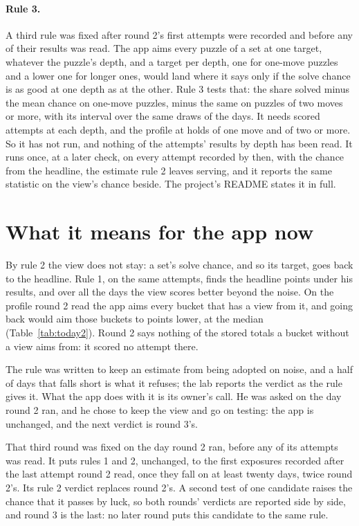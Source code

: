 \documentclass[11pt]{article}
\begin{document}
\paragraph{Rule 3.} A third rule was fixed after round 2's first attempts were recorded and before
any of their results was read. The app aims every puzzle of a set at one target, whatever the
puzzle's depth, and a target per depth, one for one-move puzzles and a lower one for longer
ones, would land where it says only if the solve chance is as good at one depth as at the other.
Rule 3 tests that: the share solved minus the mean chance on one-move puzzles, minus the same on
puzzles of two moves or more, with its interval over the same draws of the days. It needs
\TwoNeeded{} scored attempts at each depth, and the profile at \TwoRuleThreeCommit{} holds
\TwoOneScored{} of one move and \TwoTwoScored{} of two or more. So it has not run, and nothing of
the attempts' results by depth has been read. It runs once, at a later check, on every attempt
recorded by then, with the chance from the headline, the estimate rule 2 leaves serving, and it
reports the same statistic on the view's chance beside. The project's README states it in full.

\section{What it means for the app now}

By rule 2 the view does not stay: a set's solve chance, and so its target, goes back to the
headline. Rule 1, on the same attempts, finds the headline \TwoGap{} points under his results, and
over all the days the view scores better beyond the noise. On the profile round 2 read the app
aims every bucket that has a view from it, and going back would aim those \TwoWithView{} buckets
\TwoDropMin{} to \TwoDropMax{} points lower, \TwoDropMedian{} at the median
(Table~\ref{tab:today2}). Round 2 says nothing of the stored totals a bucket without a view aims
from: it scored no attempt there.

The rule was written to keep an estimate from being adopted on noise, and a half of \TwoHTwoDays{}
days that falls short is what it refuses; the lab reports the verdict as the rule gives it. What
the app does with it is its owner's call. He was asked on the day round 2 ran, and he chose to
keep the view and go on testing: the app is unchanged, and the next verdict is round 3's.

That third round was fixed on the day round 2 ran, before any of its attempts was read. It puts rules 1 and 2,
unchanged, to the first exposures recorded after the last attempt round 2 read, once they fall on
at least twenty days, twice round 2's. Its rule 2 verdict replaces round 2's. A second test of one
candidate raises the chance that it passes by luck, so both rounds' verdicts are reported side by
side, and round 3 is the last: no later round puts this candidate to the same rule.
\end{document}
